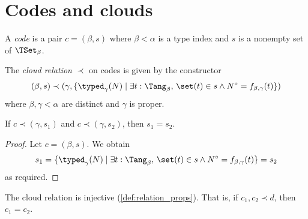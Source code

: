 \section{Codes and clouds}
\begin{definition}[code]
  \label{def:Code}
  A \emph{code} is a pair \( c = (\beta, s) \) where \( \beta < \alpha \) is a type index and \( s \) is a nonempty set of \( \TSet_\beta \).
\end{definition}
\begin{definition}[cloud]
  \label{def:cloud}
  The \emph{cloud relation} \( \prec \) on codes is given by the constructor
  \[ (\beta, s) \prec (\gamma, \{ \typed_\gamma(N) \mid \exists t : \Tang_\beta,\, \set(t) \in s \wedge N^\circ = f_{\beta,\gamma}(t) \}) \]
  where \( \beta, \gamma < \alpha \) are distinct and \( \gamma \) is proper.
\end{definition}
\begin{proposition}
  \label{prop:eq_of_cloud}
  If \( c \prec (\gamma, s_1) \) and \( c \prec (\gamma, s_2) \), then \( s_1 = s_2 \).
\end{proposition}
\begin{proof}
  Let \( c = (\beta, s) \).
  We obtain
  \[ s_1 = \{ \typed_\gamma(N) \mid \exists t : \Tang_\beta,\, \set(t) \in s \wedge N^\circ = f_{\beta,\gamma}(t) \} = s_2 \]
  as required.
\end{proof}
\begin{proposition}
  \label{prop:cloud_injective}
  The cloud relation is injective (\cref{def:relation_props}).
  That is, if \( c_1, c_2 \prec d \), then \( c_1 = c_2 \).
\end{proposition}

